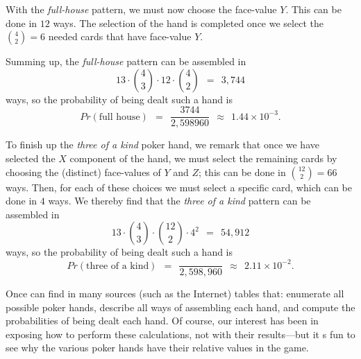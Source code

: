 \begin{itemize}
With the {\it full-house} pattern, we must now choose the face-value $Y$.  This can be done in $12$ ways.
The selection of the hand is completed once we select the $\displaystyle {4 \choose 2} = 6$
needed cards that have face-value $Y$.

Summing up, the {\it full-house} pattern can be assembled in
\[ 13 \cdot {4 \choose 3} \cdot 12 \cdot {4 \choose 2} \ \ = \ \  3,744 \]
ways, so the probability of being dealt such a hand is
\[ 
Pr(\mbox{full house}) \ \ = \ \
\frac{3744}{2,598960}  \ \ \approx \ \ 1.44 \times 10^{-3} . \]

\medskip

To finish up the {\it three of a kind} poker hand, we remark that once we have selected the $X$
component of the hand,  we must select the remaining cards by choosing the (distinct) face-values of
$Y$ and $Z$; this can be done in $\displaystyle {12 \choose 2} = 66$ ways.  Then, for each of these
choices we must select a specific card, which can be done in $4$ ways.  We thereby find that the
{\it three of a kind} pattern can be assembled in
\[ 13 \cdot {4 \choose 3} \cdot {12 \choose 2} \cdot 4^2 \ \ = \ \  54,912 \]
ways, so the probability of being dealt such a hand is
\[ Pr(\mbox{three of a kind}) \ \ = \ \
 \frac{}{2,598,960}  \ \ \approx \ \ 2.11 \times 10^{-2} . \]

\end{itemize}

Once can find in many sources (such as the Internet) tables that: enumerate all possible poker hands,
describe all ways of assembling each hand, and compute the probabilities of being dealt each hand.
Of course, our interest has been in exposing how to perform these calculations, not with their
results---but it s fun to see why the various poker hands have their relative values in the game.



